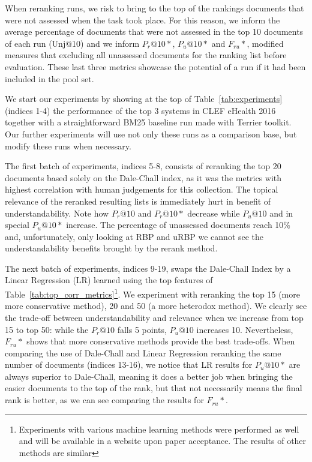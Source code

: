 When reranking runs, we risk to bring to the top of the rankings documents that were not assessed when the task took place. For this reason, we inform the average percentage of documents that were not assessed in the top 10 documents of each run (Unj@10) and we inform $P_r@10*$, $P_u@10*$ and $F_{ru}*$, modified measures that excluding all unassessed documents for the ranking list before evaluation.
These last three metrics showcase the potential of a run if it had been included in the pool set.

We start our experiments by showing at the top of Table~\ref{tab:experiments} (indices 1-4) the performance of the top 3 systems in CLEF eHealth 2016 together with a straightforward BM25 baseline run made with Terrier toolkit. Our further experiments will use not only these runs as a comparison base, but modify these runs when necessary.

The first batch of experiments, indices 5-8, consists of reranking the top 20 documents based solely on the Dale-Chall index, as it was the metrics with highest correlation with human judgements for this collection.
The topical relevance of the reranked resulting lists is immediately hurt in benefit of understandability. Note how $P_r@10$ and $P_r@10*$ decrease while $P_u@10$ and in special $P_u@10*$ increase.
The percentage of unassessed documents reach 10\% and, unfortunately, only looking at RBP and uRBP we cannot see the understandability benefits brought by the rerank method.

The next batch of experiments, indices 9-19, swaps the Dale-Chall Index by a Linear Regression (LR) learned using the top features of Table~\ref{tab:top_corr_metrics}\footnote{Experiments with various machine learning methods were performed as well and will be available in a website upon paper acceptance. The results of other methods are similar}. 
We experiment with reranking the top 15 (more more conservative method), 20 and 50 (a more heterodox method). We clearly see the trade-off between understandability and relevance when we increase from top 15 to top 50: while the $P_r@10$ falls 5 points, $P_u@10$ increases 10. Nevertheless, $F_{ru}*$ shows that more conservative methods provide the best trade-offs.
When comparing the use of Dale-Chall and Linear Regression reranking the same number of documents (indices 13-16), we notice that LR results for $P_u@10*$ are always superior to Dale-Chall, meaning it does a better job when bringing the easier documents to the top of the rank, but that not necessarily means the final rank is better, as we can see comparing the results for $F_{ru}*$.

